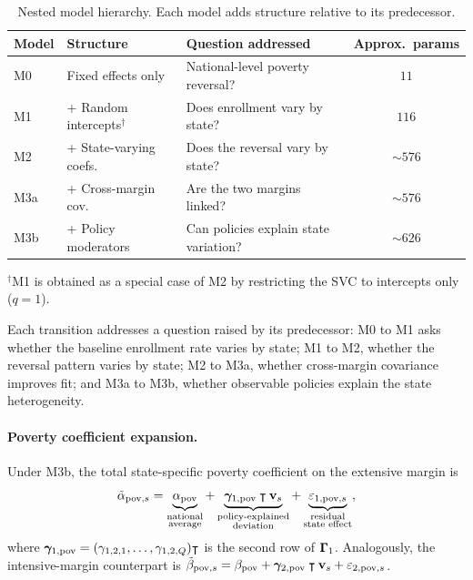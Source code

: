 \begin{table}[ht]
\centering
\caption{Nested model hierarchy. Each model adds structure relative to its
  predecessor.}\label{tab:model-hierarchy}
\smallskip
\small
\begin{tabular}{@{}llp{}c@{}}
\toprule
Model & Structure & Question addressed & Approx.\ params \\
\midrule
M0 & Fixed effects only & National-level poverty reversal? & $11$ \\
M1 & + Random intercepts$^{\dagger}$ & Does enrollment vary by state? & $116$ \\
M2 & + State-varying coefs.\ & Does the reversal vary by state? & $\sim 576$ \\
M3a & + Cross-margin cov.\ & Are the two margins linked? & $\sim 576$ \\
M3b & + Policy moderators & Can policies explain state variation? & $\sim 626$ \\
\bottomrule
\end{tabular}
\par\vspace{2pt}
{\footnotesize $^{\dagger}$M1 is obtained as a special case of M2 by
  restricting the SVC to intercepts only ($q = 1$).}
\end{table}

Each transition addresses a question raised by its predecessor: M0 to M1 asks
whether the baseline enrollment rate varies by state; M1 to M2, whether the
reversal pattern varies by state; M2 to M3a, whether cross-margin
covariance improves fit; and M3a to M3b, whether observable policies explain
the state heterogeneity.

\paragraph{Poverty coefficient expansion.}
\begin{proposition}\label{prop:poverty-expansion}
  Under M3b, the total state-specific poverty coefficient on the extensive
  margin is
  \begin{equation}\label{eq:poverty-expansion}
    \tilde{\alpha}_{\mathrm{pov},s}
    = \underbrace{\alpha_{\mathrm{pov}}}_{\substack{\text{national} \\
    \text{average}}}
    + \underbrace{\boldsymbol{\gamma}_{1,\mathrm{pov}}\intercal\mathbf{v}_s}_{\substack{\text{policy-explained}
    \\ \text{deviation}}}
    + \underbrace{\varepsilon_{1,\mathrm{pov},s}}_{\substack{\text{residual}
    \\ \text{state effect}}},
  \end{equation}
  where $\boldsymbol{\gamma}_{1,\mathrm{pov}} = (\gamma_{1,2,1},\ldots,\gamma_{1,2,Q})\intercal$
  is the second row of $\boldsymbol{\Gamma}_1$. Analogously, the intensive-margin
  counterpart is
  $\tilde{\beta}_{\mathrm{pov},s} = \beta_{\mathrm{pov}} +
  \boldsymbol{\gamma}_{2,\mathrm{pov}}\intercal\mathbf{v}_s + \varepsilon_{2,\mathrm{pov},s}$.
\end{proposition}


